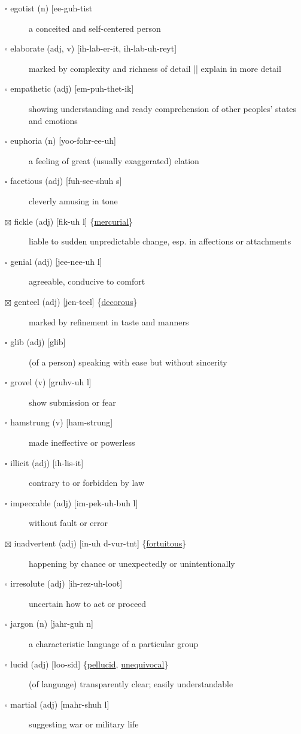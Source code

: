 \documentclass[11pt]{article}
\begin{document}
\begin{description}
\item[{$\square$ \label{orge21faa1} \label{org768b657}egotist (n) [ee-guh-tist}] a conceited and self-centered person
\item[{$\square$ elaborate (adj, v) [ih-lab-er-it, ih-lab-uh-reyt]}] marked by complexity and richness of detail || explain in more detail
\item[{$\square$ empathetic (adj) [em-puh-thet-ik]}] showing understanding and ready comprehension of other peoples' states and emotions
\item[{$\square$ euphoria (n) [yoo-fohr-ee-uh]}] a feeling of great (usually exaggerated) elation
\item[{$\square$ facetious (adj) [fuh-see-shuh s]}] cleverly amusing in tone
\item[{$\boxtimes$ \label{org93e669e}fickle (adj) [fik-uh l] \{\hyperref[org76ea20d]{mercurial}\}}] liable to sudden unpredictable change, esp. in affections or attachments
\item[{$\square$ genial (adj) [jee-nee-uh l]}] agreeable, conducive to comfort
\item[{$\boxtimes$ \label{orgf14b259}genteel (adj) [jen-teel] \{\hyperref[orge30bfd6]{decorous}\}}] marked by refinement in taste and manners
\item[{$\square$ \label{org60a9dab} glib (adj) [glib]}] (of a person) speaking with ease but without sincerity
\item[{$\square$ grovel (v) [gruhv-uh l]}] show submission or fear
\item[{$\square$ hamstrung (v) [ham-strung]}] made ineffective or powerless
\item[{$\square$ illicit (adj) [ih-lis-it]}] contrary to or forbidden by law
\item[{$\square$ impeccable (adj) [im-pek-uh-buh l]}] without fault or error
\item[{$\boxtimes$ \label{orgf661499}inadvertent (adj) [in-uh d-vur-tnt] \{\hyperref[org95f167d]{fortuitous}\}}] happening by chance or unexpectedly or unintentionally
\item[{$\square$ irresolute (adj) [ih-rez-uh-loot]}] uncertain how to act or proceed
\item[{$\square$ jargon (n) [jahr-guh n]}] a characteristic language of a particular group
\item[{$\square$ \label{org6dfd5c3}lucid (adj) [loo-sid] \{\hyperref[org9cbc3b4]{pellucid}, \hyperref[org54a7180]{unequivocal}\}}] (of language) transparently clear; easily understandable
\item[{$\square$ martial (adj) [mahr-shuh l]}] suggesting war or military life

\end{description}
\end{document}
